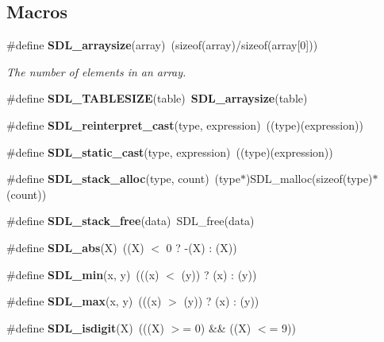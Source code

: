 \subsection*{Macros}
\begin{DoxyCompactItemize}
\item 
\#define {\bf S\+D\+L\+\_\+arraysize}(array)~(sizeof(array)/sizeof(array[0]))\label{_s_d_l__stdinc_8h_a56cfbf2e664506e5f4bb2e05997be8ae}

\begin{DoxyCompactList}\small\item\em The number of elements in an array. \end{DoxyCompactList}\item 
\#define {\bfseries S\+D\+L\+\_\+\+T\+A\+B\+L\+E\+S\+I\+Z\+E}(table)~{\bf S\+D\+L\+\_\+arraysize}(table)\label{_s_d_l__stdinc_8h_ac9d76e3a8ba6474d1714f13ca3c9d7e6}

\item 
\#define {\bfseries S\+D\+L\+\_\+reinterpret\+\_\+cast}(type,  expression)~((type)(expression))\label{_s_d_l__stdinc_8h_a9891f68858953b42cbc18e68a441e39d}

\item 
\#define {\bfseries S\+D\+L\+\_\+static\+\_\+cast}(type,  expression)~((type)(expression))\label{_s_d_l__stdinc_8h_a774ea048cf20bd5f86f31da56d2937ff}

\item 
\#define {\bfseries S\+D\+L\+\_\+stack\+\_\+alloc}(type,  count)~(type$\ast$)S\+D\+L\+\_\+malloc(sizeof(type)$\ast$(count))\label{_s_d_l__stdinc_8h_a6c6778dd1ee11d2edce116271c822fbd}

\item 
\#define {\bfseries S\+D\+L\+\_\+stack\+\_\+free}(data)~S\+D\+L\+\_\+free(data)\label{_s_d_l__stdinc_8h_aca62cdb628b52c2f1f2a3004ddf721ce}

\item 
\#define {\bfseries S\+D\+L\+\_\+abs}(X)~((X) $<$ 0 ? -\/(X) \+: (X))\label{_s_d_l__stdinc_8h_a6ffbc96775d304bab561d191e71874d5}

\item 
\#define {\bfseries S\+D\+L\+\_\+min}(x,  y)~(((x) $<$ (y)) ? (x) \+: (y))\label{_s_d_l__stdinc_8h_ad93f0b2393a3aa89f9ce24ac2642744e}

\item 
\#define {\bfseries S\+D\+L\+\_\+max}(x,  y)~(((x) $>$ (y)) ? (x) \+: (y))\label{_s_d_l__stdinc_8h_ae3ab6e7584a16c7217ca0a4622212b61}

\item 
\#define {\bfseries S\+D\+L\+\_\+isdigit}(X)~(((X) $>$= \textquotesingle{}0\textquotesingle{}) \&\& ((X) $<$= \textquotesingle{}9\textquotesingle{}))\label{_s_d_l__stdinc_8h_a6825ac86a89e741c6a05f1b36ef47db5}


\end{DoxyCompactItemize}
